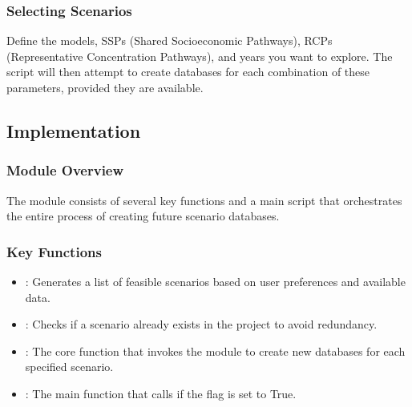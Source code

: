 \documentclass[letterpaper,10pt,english]{sphinxmanual}
\begin{document}
\subsubsection{Selecting Scenarios}
\label{\detokenize{FutureScenarios:selecting-scenarios}}
\sphinxAtStartPar
Define the models, SSPs (Shared Socioeconomic Pathways), RCPs (Representative Concentration Pathways), and years you want to explore. The script will then attempt to create databases for each combination of these parameters, provided they are available.


\subsection{Implementation}
\label{\detokenize{FutureScenarios:implementation}}

\subsubsection{Module Overview}
\label{\detokenize{FutureScenarios:module-overview}}
\sphinxAtStartPar
The  module consists of several key functions and a main script that orchestrates the entire process of creating future scenario databases.


\subsubsection{Key Functions}
\label{\detokenize{FutureScenarios:key-functions}}\begin{itemize}
\item {} 
\sphinxAtStartPar
{}: Generates a list of feasible scenarios based on user preferences and available data.

\item {} 
\sphinxAtStartPar
{}: Checks if a scenario already exists in the project to avoid redundancy.

\item {} 
\sphinxAtStartPar
{}: The core function that invokes the  module to create new databases for each specified scenario.

\item {} 
\sphinxAtStartPar
{}: The main function that calls  if the  flag is set to True.

\end{itemize}
\end{document}
